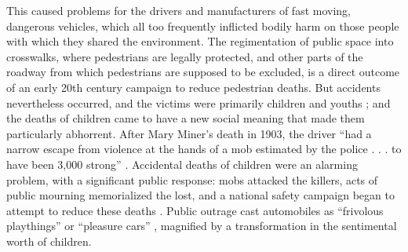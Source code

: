 This caused problems for the drivers and
manufacturers of fast moving, dangerous vehicles, which all too
frequently inflicted bodily harm on those people with which they
shared the environment. The regimentation of public space into
crosswalks, where pedestrians are legally protected, and other parts
of the roadway from which pedestrians are supposed to be excluded, is
a direct outcome of an early 20th century campaign to reduce
pedestrian deaths. But accidents nevertheless occurred, and the victims were primarily
children and youths \cite[p. 11]{nortonFighting}; and the deaths of
children came to have a new social meaning that made them 
particularly abhorrent.
After Mary Miner's death in 1903, the driver ``had a narrow escape
from violence at the hands of a mob estimated by the police . . . to
have been 3,000 strong'' \cite[p. 22]{zelizer}. Accidental deaths of children were an
alarming problem, with a significant public response:  mobs attacked
the killers, acts of public mourning memorialized the lost, and a
national safety campaign began to attempt to reduce these
deaths \cite[p. 23]{zelizer}. Public outrage cast automobiles as
``frivolous playthings'' or ``pleasure cars'' \cite[p. 12]{nortonFighting}, magnified
by a transformation in the sentimental worth of
children. 





